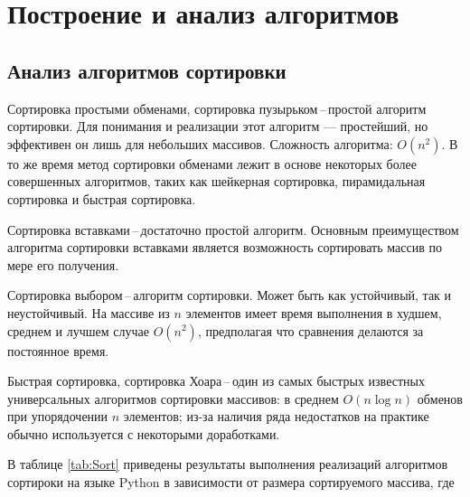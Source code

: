 \documentclass[
	12pt,
	paper=A4,
	oneside,
	draft
]{scrreprt}
\begin{document}
\chapter{Построение и анализ алгоритмов}
\section{Анализ алгоритмов сортировки}
\thispagestyle{empty}

Сортировка простыми обменами, сортировка пузырьком\,--\,простой алгоритм сортировки. Для понимания и реализации этот алгоритм — простейший, но эффективен он лишь для небольших массивов. Сложность алгоритма: $ O(n^{2})$. В то же время метод сортировки обменами лежит в основе некоторых более совершенных алгоритмов, таких как шейкерная сортировка, пирамидальная сортировка и быстрая сортировка.

Сортировка вставками\,--\,достаточно простой алгоритм. Основным преимуществом алгоритма сортировки вставками является возможность сортировать массив по мере его получения.

Сортировка выбором\,--\,алгоритм сортировки. Может быть как устойчивый, так и неустойчивый. На массиве из $n$ элементов имеет время выполнения в худшем, среднем и лучшем случае $ O(n^{2})$, предполагая что сравнения делаются за постоянное время.

Быстрая сортировка, сортировка Хоара\,--\,один из самых быстрых известных универсальных алгоритмов сортировки массивов: в среднем $O(n\log n)$ обменов при упорядочении $n$ элементов; из-за наличия ряда недостатков на практике обычно используется с некоторыми доработками.


В таблице \ref{tab:Sort} приведены результаты выполнения реализаций алгоритмов сортироки на языке Python в зависимости от размера сортируемого массива, где
\end{document}
